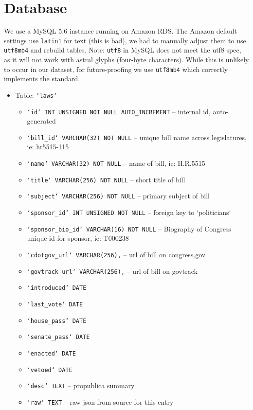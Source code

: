 \documentclass[12pt]{article}
\newcommand{\code}[1]{\texttt{#1}}
\begin{document}
\section{Database}

We use a MySQL 5.6 instance running on Amazon RDS. The Amazon default settings use \code{latin1} for text (this is bad), we had to manually adjust them to use \code{utf8mb4} and rebuild tables. Note: \code{utf8} in MySQL does not meet the utf8 spec, as it will not work with astral glyphs (four-byte characters). While this is unlikely to occur in our dataset, for future-proofing we use \code{utf8mb4} which correctly implements the standard. 

\begin{itemize}
	\item[] Table: \code{`laws`}
	\begin{itemize}
		\item \code{`id` INT UNSIGNED NOT NULL AUTO\_INCREMENT}	-- internal id, auto-generated
		\item \code{`bill\_id` VARCHAR(32) NOT NULL}			-- unique bill name across legislatures, ie: hr5515-115
		\item \code{`name` VARCHAR(32) NOT NULL}				-- name of bill, ie: H.R.5515
		\item \code{`title` VARCHAR(256) NOT NULL}				-- short title of bill
		\item \code{`subject` VARCHAR(256) NOT NULL}			-- primary subject of bill
		\item \code{`sponsor\_id` INT UNSIGNED NOT NULL}		-- foreign key to `politicians`
		\item \code{`sponsor\_bio\_id` VARCHAR(16) NOT NULL}	-- Biography of Congress unique id for sponsor, ie: T000238
		\item \code{`cdotgov\_url` VARCHAR(256),}				-- url of bill on congress.gov
		\item \code{`govtrack\_url` VARCHAR(256),}				-- url of bill on govtrack
		\item \code{`introduced` DATE}
		\item \code{`last\_vote` DATE}
		\item \code{`house\_pass` DATE}
		\item \code{`senate\_pass` DATE}
		\item \code{`enacted` DATE}
		\item \code{`vetoed` DATE}
		\item \code{`desc` TEXT}								-- propublica summary
		\item \code{`raw` TEXT}									-- raw json from source for this entry

\end{itemize}
\end{itemize}
\end{document}
